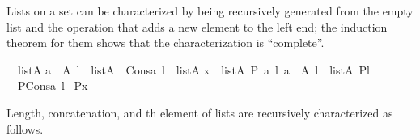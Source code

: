 Lists on a set  can be characterized by being
recursively generated from the empty list \isa{{\isacharbrackleft}{\kern0pt}{\isacharbrackright}{\kern0pt}} and the
operation  that adds a new element to the left end;
the induction theorem for them shows that the characterization is
“complete”.%
\begin{isabelle}%
{\isacharbrackleft}{\kern0pt}{\isacharbrackright}{\kern0pt}\ {\isasymin}\ list{\isacharparenleft}{\kern0pt}A{\isacharparenright}{\kern0pt}\isasep\isanewline%
{\isasymlbrakk}a\ {\isasymin}\ A{\isacharsemicolon}{\kern0pt}\ l\ {\isasymin}\ list{\isacharparenleft}{\kern0pt}A{\isacharparenright}{\kern0pt}{\isasymrbrakk}\ {\isasymLongrightarrow}\ Cons{\isacharparenleft}{\kern0pt}a{\isacharcomma}{\kern0pt}\ l{\isacharparenright}{\kern0pt}\ {\isasymin}\ list{\isacharparenleft}{\kern0pt}A{\isacharparenright}{\kern0pt}\isasep\isanewline\isanewline%
{\isasymlbrakk}x\ {\isasymin}\ list{\isacharparenleft}{\kern0pt}A{\isacharparenright}{\kern0pt}{\isacharsemicolon}{\kern0pt}\ P{\isacharparenleft}{\kern0pt}{\isacharbrackleft}{\kern0pt}{\isacharbrackright}{\kern0pt}{\isacharparenright}{\kern0pt}{\isacharsemicolon}{\kern0pt}\ {\isasymAnd}a\ l{\isachardot}{\kern0pt}\ {\isasymlbrakk}a\ {\isasymin}\ A{\isacharsemicolon}{\kern0pt}\ l\ {\isasymin}\ list{\isacharparenleft}{\kern0pt}A{\isacharparenright}{\kern0pt}{\isacharsemicolon}{\kern0pt}\ P{\isacharparenleft}{\kern0pt}l{\isacharparenright}{\kern0pt}{\isasymrbrakk}\ {\isasymLongrightarrow}\isanewline
\ \ P{\isacharparenleft}{\kern0pt}Cons{\isacharparenleft}{\kern0pt}a{\isacharcomma}{\kern0pt}\ l{\isacharparenright}{\kern0pt}{\isacharparenright}{\kern0pt}{\isasymrbrakk}
{\isasymLongrightarrow}\ P{\isacharparenleft}{\kern0pt}x{\isacharparenright}{\kern0pt}%
\end{isabelle}%
Length, concatenation, and th element of lists are
recursively characterized as follows.%

